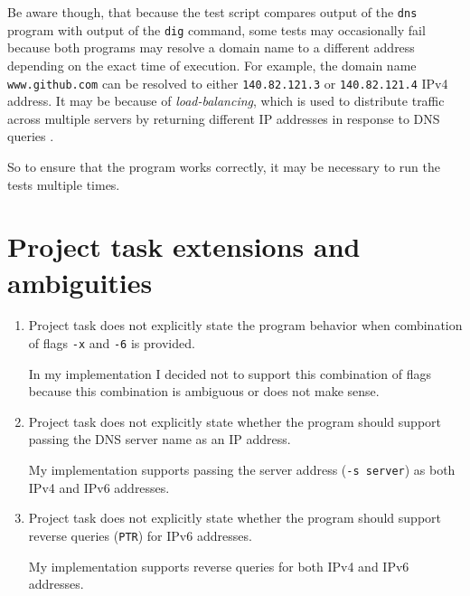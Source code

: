 \documentclass[a4paper, 11pt]{article}
\begin{document}
    Be aware though, that because the test script compares output of the \texttt{dns} program with output of the \texttt{dig} command, 
    some tests may occasionally fail because both programs may resolve a domain name 
    to a different address depending on the exact time of execution.
    For example, the domain name \texttt{www.github.com} can be resolved to either \texttt{140.82.121.3} or \texttt{140.82.121.4} IPv4 address. 
    It may be because of \emph{load-balancing}, 
    which is used to distribute traffic across multiple servers by returning different IP addresses in response to DNS queries \cite{Brisco1995}.
    
    So to ensure that the program works correctly, it may be necessary to run the tests multiple times.

\section{Project task extensions and ambiguities}
    \begin{enumerate}
        \item Project task does not explicitly state the program behavior when combination of flags \texttt{-x} and \texttt{-6} is provided.
        
            In my implementation I decided not to support this combination of flags because this combination is ambiguous or does not make sense.
        \item Project task does not explicitly state whether the program should support passing the DNS server name as an IP address.
        
            My implementation supports passing the server address (\texttt{-s server}) as both IPv4 and IPv6 addresses.
        \item Project task does not explicitly state whether the program should support reverse queries (\texttt{PTR}) for IPv6 addresses.
        
            My implementation supports reverse queries for both IPv4 and IPv6 addresses.
    \end{enumerate}


\printbibliography %
\end{document}
